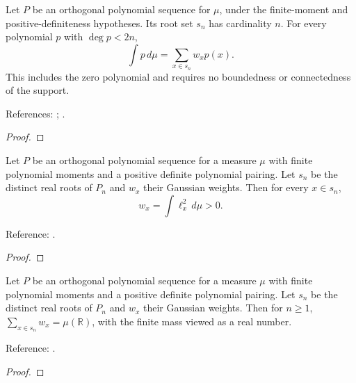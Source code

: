 \begin{theorem}
\label{thm:general-gauss-exact}
\leanok
Let $P$ be an orthogonal polynomial sequence for $\mu$, under the finite-moment
and positive-definiteness hypotheses. Its root set $s_n$ has cardinality $n$.
For every polynomial $p$ with $\deg p<2n$,
\[
 \int p\,d\mu=\sum_{x\in s_n}w_xp(x).
\]
This includes the zero polynomial and requires no boundedness or connectedness
of the support.

References: \cite[3.5(v)]{dlmf}; \cite[Section 3.4]{szego}.
\end{theorem}
\begin{proof}
\leanok
\end{proof}

\begin{theorem}
\label{thm:general-gauss-positive}
\leanok
Let $P$ be an orthogonal polynomial sequence for a measure $\mu$ with finite polynomial moments and a positive definite polynomial pairing. Let $s_n$ be the distinct real roots of $P_n$ and $w_x$ their Gaussian weights. Then for every $x\in s_n$,
\[
 w_x=\int\ell_x^2\,d\mu>0.
\]

Reference: \cite[3.5(v)]{dlmf}.
\end{theorem}
\begin{proof}
\leanok
\end{proof}

\begin{theorem}
\label{thm:general-gauss-mass}
\leanok
Let $P$ be an orthogonal polynomial sequence for a measure $\mu$ with finite polynomial moments and a positive definite polynomial pairing. Let $s_n$ be the distinct real roots of $P_n$ and $w_x$ their Gaussian weights. Then for $n\ge1$,
$\sum_{x\in s_n}w_x=\mu(\mathbb R)$, with the finite mass viewed as a real number.

Reference: \cite[3.5(v)]{dlmf}.
\end{theorem}
\begin{proof}
\leanok
\end{proof}

